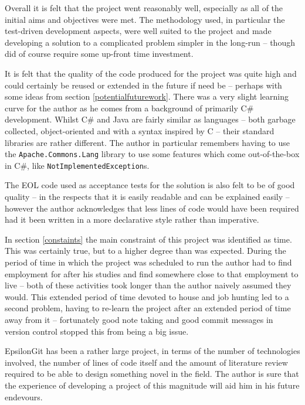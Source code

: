 \documentclass[11pt]{book}
\newcommand{\code}[1]{\texttt{#1}}
\begin{document}
Overall it is felt that the project went reasonably well, especially as all of the initial aims and objectives were met. The methodology used, in particular the test-driven development aspects, were well suited to the project and made developing a solution to a complicated problem simpler in the long-run -- though did of course require some up-front time investment.

It is felt that the quality of the code produced for the project was quite high and could certainly be reused or extended in the future if need be -- perhaps with some ideas from section \ref{potentialfuturework}. There was a very slight learning curve for the author as he comes from a background of primarily C\# development. Whilst C\# and Java are fairly similar as languages -- both garbage collected, object-oriented and with a syntax inspired by C -- their standard libraries are rather different. The author in particular remembers having to use the \code{Apache.Commons.Lang} library to use some features which come out-of-the-box in C\#, like \code{NotImplementedException}s.

The EOL code used as acceptance tests for the solution is also felt to be of good quality -- in the respects that it is easily readable and can be explained easily -- however the author acknowledges that less lines of code would have been required had it been written in a more declarative style rather than imperative. 

In section \ref{constaints} the main constraint of this project was identified as time. This was certainly true, but to a higher degree than was expected. During the period of time in which the project was scheduled to run the author had to find employment for after his studies and find somewhere close to that employment to live -- both of these activities took longer than the author naively assumed they would. This extended period of time devoted to house and job hunting led to a second problem, having to re-learn the project after an extended period of time away from it -- fortunately good note taking and good commit messages in version control stopped this from being a big issue. 

EpsilonGit has been a rather large project, in terms of the number of technologies involved, the number of lines of code itself and the amount of literature review required to be able to design something novel in the field. The author is sure that the experience of developing a project of this magnitude will aid him in his future endevours.
\end{document}
